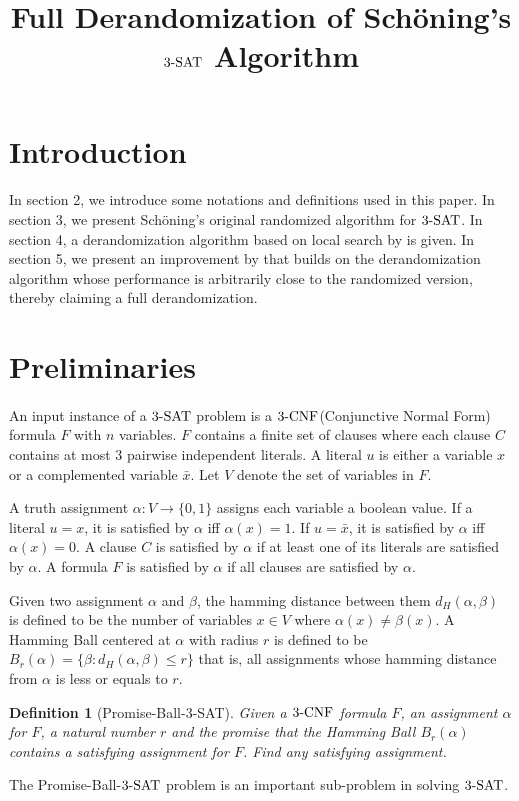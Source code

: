 \documentclass{article}
\title{Full Derandomization of Sch\"{o}ning's $\SAT$ Algorithm}
\author{}
\date{}
\newcommand{\SAT}{\textnormal{$3$-SAT}}
\newcommand{\CNF}{\textnormal{$3$-CNF}}
\newcommand{\dist}[2]{d_H(#1,#2)}
\newcommand{\ball}[2]{B_{#1}(#2)}
\newtheorem{definition}{Definition}
\begin{document}
\maketitle

\section{Introduction}
\paragraph{} In section 2, we introduce some notations and definitions used in this paper. In section 3, we present Sch\"{o}ning's original randomized algorithm\cite{Schoning99} for $\SAT$. In section 4, a derandomization algorithm based on local search by \cite{Dantsin02} is given. In section 5, we present an improvement by \cite{Moser11} that builds on the derandomization algorithm whose performance is arbitrarily close to the randomized version, thereby claiming a full derandomization.

\section{Preliminaries}
\paragraph{} An input instance of a $\SAT$ problem is a $\CNF$(Conjunctive Normal Form) formula $F$ with $n$ variables. $F$ contains a finite set of clauses where each clause $C$ contains at most $3$ pairwise independent literals. A literal $u$ is either a variable $x$ or a complemented variable $\bar{x}$. Let $V$ denote the set of variables in $F$. \par 
A truth assignment $\alpha: V\rightarrow \{0,1\}$ assigns each variable a boolean value. If a literal $u = x$, it is satisfied by $\alpha$ iff $\alpha(x) = 1$. If $u = \bar{x}$, it is satisfied by $\alpha$ iff $\alpha(x) = 0$. A clause $C$ is satisfied by $\alpha$ if at least one of its literals are satisfied by $\alpha$. A formula $F$ is satisfied by $\alpha$ if all clauses are satisfied by $\alpha$. \par 
Given two assignment $\alpha$ and $\beta$, the hamming distance between them $\dist{\alpha}{\beta}$ is defined to be the number of variables $x \in V$ where $\alpha(x) \neq \beta(x)$. A Hamming Ball centered at $\alpha$ with radius $r$ is defined to be $\ball{r}{\alpha} = \{\beta: \dist{\alpha}{\beta} \leq r\}$ that is, all assignments whose hamming distance from $\alpha$ is less or equals to $r$. \par 
\begin{definition}[Promise-Ball-\SAT\cite{Moser11}]
	Given a $\CNF$ formula $F$, an assignment $\alpha$ for $F$, a natural number $r$ and the promise that the Hamming Ball $\ball{r}{\alpha}$ contains a satisfying assignment for $F$. Find any satisfying assignment.
\end{definition}
The Promise-Ball-$\SAT$ problem is an important sub-problem in solving $\SAT$. 
\end{document}
